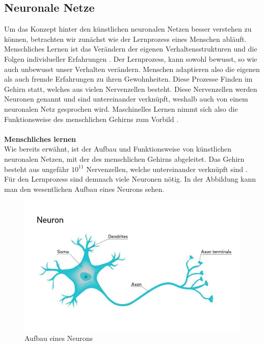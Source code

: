 \documentclass[a4paper,12pt,oneside]{article}
\begin{document}
  \subsection{Neuronale Netze}\label{s.neuronalenetze}
Um das Konzept hinter den künstlichen neuronalen Netzen besser verstehen zu können, betrachten wir zunächst wie der Lernprozess eines Menschen abläuft. Menschliches Lernen ist das Verändern der eigenen Verhaltensstrukturen und die Folgen individueller Erfahrungen \cite{hoffmann2016lern}. Der Lernprozess, kann sowohl bewusst, so wie auch unbewusst unser Verhalten verändern. Menschen adaptieren also die eigenen als auch fremde Erfahrungen zu ihren Gewohnheiten. Diese Prozesse Finden im Gehirn statt, welches aus vielen Nervenzellen besteht. Diese Nervenzellen werden Neuronen genannt und sind untereinander verknüpft, weshalb auch von einem neuronalen Netz gesprochen wird. Maschinelles Lernen nimmt sich also die Funktionsweise des menschlichen Gehirns zum Vorbild \cite[]{ertel2013grundkurs}.\\\\
\textbf{Menschliches lernen}\\
Wie bereits erwähnt, ist der Aufbau und Funktionsweise von künstlichen neuronalen Netzen, mit der des menschlichen Gehirns abgeleitet. Das Gehirn besteht aus ungefähr $10^{11}$ Nervenzellen, welche untereinander verknüpft sind \cite[265ff.]{ertel2013grundkurs}. Für den Lernprozess sind demnach viele Neuronen nötig. In der Abbildung kann man den wesentlichen Aufbau eines Neurons sehen.
\begin{figure}
	[h]
	\centering
	\includegraphics[scale=0.7]{Sources/neuron.jpg}
	\caption{Aufbau eines Neurons \cite{neuron2018UoC}}
	\label{img:neuron}
\end{figure}\\
\end{document}
